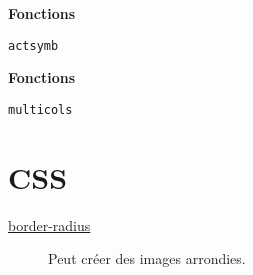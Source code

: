 \documentclass[10pt, french]{article}
\begin{document}
\begin{multicols*}{3}
\begin{algo2}[actuarialsymbol]
\textbf{Fonctions}
\begin{description}
	\item	\texttt{actsymb}
\end{description}
\end{algo2}

\begin{algo2}[amsmath]
\end{algo2}

\begin{algo2}[amsymb]
\end{algo2}

\begin{algo2}[multicol]
\textbf{Fonctions}
\begin{description}
	\item	\texttt{multicols}
\end{description}
\end{algo2}

\begin{algo2}[xcolor]
\end{algo2}

\begin{algo2}[tikz]
\end{algo2}

\begin{algo2}[tcolorbox]
\end{algo2}


\newpage

\section{CSS}

\begin{algo2}[images]
\begin{description}
    \item[\href{https://www.w3schools.com/css/css3_images.asp}{border-radius}]  Peut créer des images arrondies.
\end{description}
\end{algo2}

\end{multicols*}
\end{document}
